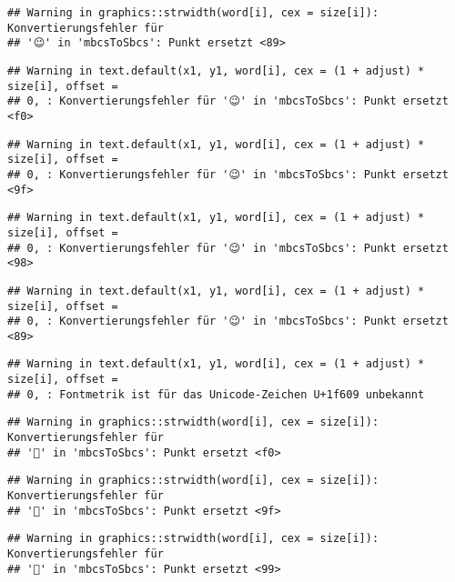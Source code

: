 \documentclass[
]{book}
\begin{document}
\begin{verbatim}
## Warning in graphics::strwidth(word[i], cex = size[i]): Konvertierungsfehler für
## '😉' in 'mbcsToSbcs': Punkt ersetzt <89>
\end{verbatim}

\begin{verbatim}
## Warning in text.default(x1, y1, word[i], cex = (1 + adjust) * size[i], offset =
## 0, : Konvertierungsfehler für '😉' in 'mbcsToSbcs': Punkt ersetzt <f0>
\end{verbatim}

\begin{verbatim}
## Warning in text.default(x1, y1, word[i], cex = (1 + adjust) * size[i], offset =
## 0, : Konvertierungsfehler für '😉' in 'mbcsToSbcs': Punkt ersetzt <9f>
\end{verbatim}

\begin{verbatim}
## Warning in text.default(x1, y1, word[i], cex = (1 + adjust) * size[i], offset =
## 0, : Konvertierungsfehler für '😉' in 'mbcsToSbcs': Punkt ersetzt <98>
\end{verbatim}

\begin{verbatim}
## Warning in text.default(x1, y1, word[i], cex = (1 + adjust) * size[i], offset =
## 0, : Konvertierungsfehler für '😉' in 'mbcsToSbcs': Punkt ersetzt <89>
\end{verbatim}

\begin{verbatim}
## Warning in text.default(x1, y1, word[i], cex = (1 + adjust) * size[i], offset =
## 0, : Fontmetrik ist für das Unicode-Zeichen U+1f609 unbekannt
\end{verbatim}

\begin{verbatim}
## Warning in graphics::strwidth(word[i], cex = size[i]): Konvertierungsfehler für
## '🙈' in 'mbcsToSbcs': Punkt ersetzt <f0>
\end{verbatim}

\begin{verbatim}
## Warning in graphics::strwidth(word[i], cex = size[i]): Konvertierungsfehler für
## '🙈' in 'mbcsToSbcs': Punkt ersetzt <9f>
\end{verbatim}

\begin{verbatim}
## Warning in graphics::strwidth(word[i], cex = size[i]): Konvertierungsfehler für
## '🙈' in 'mbcsToSbcs': Punkt ersetzt <99>
\end{verbatim}
\end{document}
